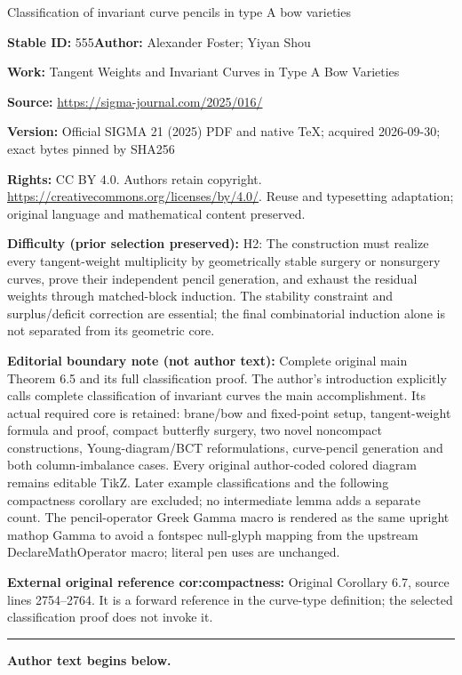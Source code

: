 \documentclass[11pt]{article}
\numberwithin{equation}{section}
\begin{document}
\begin{center}\Large Classification of invariant curve pencils in type A bow varieties\end{center}
\noindent\textbf{Stable ID:} 555\quad\textbf{Author:} Alexander Foster; Yiyan Shou\par
\noindent\textbf{Work:} Tangent Weights and Invariant Curves in Type A Bow Varieties\par
\noindent\textbf{Source:} \url{https://sigma-journal.com/2025/016/}\par
\noindent\textbf{Version:} Official SIGMA 21 (2025) PDF and native TeX; acquired 2026-09-30; exact bytes pinned by SHA256\par
\noindent\textbf{Rights:} CC BY 4.0. Authors retain copyright. \url{https://creativecommons.org/licenses/by/4.0/}. Reuse and typesetting adaptation; original language and mathematical content preserved.\par
\noindent\textbf{Difficulty (prior selection preserved):} {\CJKfont H2: The construction must realize every tangent-weight multiplicity by geometrically stable surgery or nonsurgery curves, prove their independent pencil generation, and exhaust the residual weights through matched-block induction. The stability constraint and surplus/deficit correction are essential; the final combinatorial induction alone is not separated from its geometric core.}\par
\medskip\noindent\textbf{Editorial boundary note (not author text):} Complete original main Theorem 6.5 and its full classification proof. The author’s introduction explicitly calls complete classification of invariant curves the main accomplishment. Its actual required core is retained: brane/bow and fixed-point setup, tangent-weight formula and proof, compact butterfly surgery, two novel noncompact constructions, Young-diagram/BCT reformulations, curve-pencil generation and both column-imbalance cases. Every original author-coded colored diagram remains editable TikZ. Later example classifications and the following compactness corollary are excluded; no intermediate lemma adds a separate count. The pencil-operator Greek Gamma macro is rendered as the same upright mathop Gamma to avoid a fontspec null-glyph mapping from the upstream DeclareMathOperator macro; literal pen uses are unchanged.\par
\noindent\textbf{External original reference cor:compactness:} Original Corollary 6.7, source lines 2754–2764. It is a forward reference in the curve-type definition; the selected classification proof does not invoke it.\par
\medskip\hrule\medskip\noindent\textbf{Author text begins below.}\par
\setcounter{section}{1}
\end{document}
